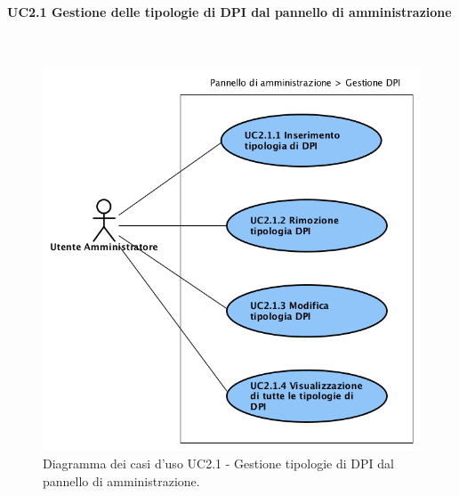 		\paragraph*{UC2.1 Gestione delle tipologie di DPI dal pannello di amministrazione }\mbox{} \\
			\label{section:UC2_1}
			\begin{figure}[H]
				\begin{center}
					\includegraphics[width=12cm]{Pics/UC2_1GestioneDispositiviDiProtezioneIndividualeDaPannelloDiAmministrazione.png}
					\caption{
						Diagramma dei casi d'uso UC2.1 - Gestione tipologie di DPI dal pannello di amministrazione.}
					\label{fig:UC2_1GestioneDPIAmministrazione}
				\end{center}
			\end{figure}
